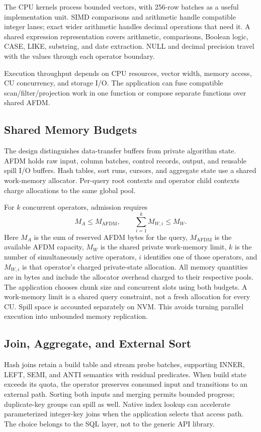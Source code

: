 \documentclass[sigconf, nonacm]{acmart}
\begin{document}
The CPU kernels process bounded vectors, with 256-row batches as a useful
implementation unit. SIMD comparisons and arithmetic handle compatible
integer lanes; exact wider arithmetic handles decimal operations that need
it. A shared expression representation covers arithmetic, comparisons,
Boolean logic, CASE, LIKE, substring, and date extraction. NULL and decimal
precision travel with the values through each operator boundary.

Execution throughput depends on CPU resources, vector width, memory access,
CU concurrency, and storage I/O.
The application can fuse compatible scan/filter/projection work in one
function or compose separate functions over shared AFDM.

\subsection{Shared Memory Budgets}
The design distinguishes data-transfer buffers from private algorithm state.
AFDM holds raw input, column batches, control records, output, and reusable
spill I/O buffers. Hash tables, sort runs, cursors, and aggregate state use
a shared work-memory allocator. Per-query root contexts and operator child
contexts charge allocations to the same global pool.

For $k$ concurrent operators, admission requires
\begin{equation}
 M_A \leq M_{\mathrm{AFDM}},\qquad
 \sum_{i=1}^{k} M_{W,i} \leq M_W.
\end{equation}
Here $M_A$ is the sum of reserved AFDM bytes for the query,
$M_{\mathrm{AFDM}}$ is the available AFDM capacity, $M_W$ is the shared
private work-memory limit, $k$ is the number of simultaneously active
operators, $i$ identifies one of those operators, and $M_{W,i}$ is that
operator's charged private-state allocation. All memory quantities are in
bytes and include the allocator overhead charged to their respective pools.
The application chooses chunk size and concurrent slots using both budgets.
A work-memory limit is a shared query constraint, not a fresh allocation for
every CU. Spill space is accounted separately on NVM. This avoids turning
parallel execution into unbounded memory replication.

\subsection{Join, Aggregate, and External Sort}
Hash joins retain a build table and stream probe batches, supporting INNER,
LEFT, SEMI, and ANTI semantics with residual predicates. When build state
exceeds its quota, the operator preserves consumed input and transitions to
an external path. Sorting both inputs and merging permits bounded progress;
duplicate-key groups can spill as well. Native index lookup can accelerate
parameterized integer-key joins when the application selects that access
path. The choice belongs to the SQL layer, not to the generic API library.
\end{document}
